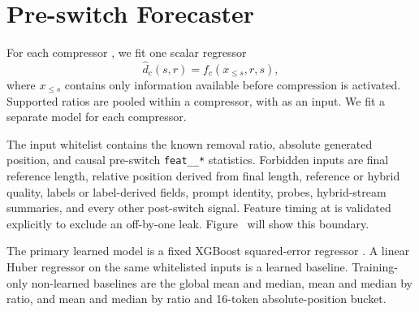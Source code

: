 \section{Pre-switch Forecaster}

For each compressor \compressor, we fit one scalar regressor
\begin{equation}
\hat d_c(s,r) = f_c(x_{\leq s}, r, s),
\end{equation}
where $x_{\leq s}$ contains only information available before compression is
activated. Supported ratios are pooled within a compressor, with \ratio as an
input. We fit a separate model for each compressor.

The input whitelist contains the known removal ratio, absolute generated
position, and causal pre-switch \texttt{feat\_\_*} statistics. Forbidden
inputs are final reference length, relative position derived from final
length, reference or hybrid quality, labels or label-derived fields, prompt
identity, probes, hybrid-stream summaries, and every other post-switch signal.
Feature timing at \switchpos is validated explicitly to exclude an off-by-one
leak. Figure~ will show this boundary.

The primary learned model is a fixed XGBoost squared-error regressor
\citep{xgboost}. A linear Huber regressor on the same whitelisted inputs is a
learned baseline. Training-only non-learned baselines are the global mean and
median, mean and median by ratio, and mean and median by ratio and 16-token
absolute-position bucket. 
